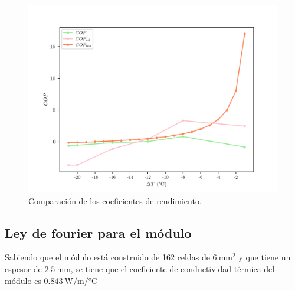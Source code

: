 \begin{figure}[ht]
    \centering
    \includegraphics[width = 0.5\linewidth]{img/refri_cops.png}
    \caption{Comparación de los coeficientes de rendimiento.}
    \label{fig:refri_cops}
\end{figure}

\subsection{Ley de fourier para el módulo}

Sabiendo que el módulo está construido de 162 celdas de $\SI{6}{\milli\meter\squared}$ y que tiene un espesor de $\SI{2.5}{\milli\meter}$, se tiene que el coeficiente de conductividad térmica del módulo es $\SI{0.843}{\watt\per\meter\per\celsius}$

